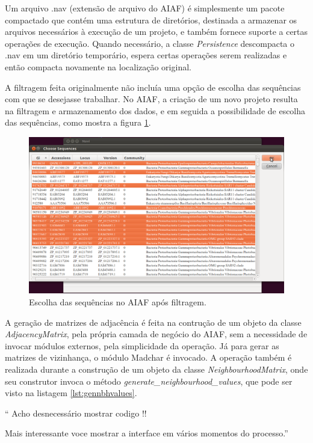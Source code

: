 Um arquivo .nav (extensão de arquivo do AIAF) é simplesmente um pacote compactado que contém uma estrutura de diretórios, destinada a armazenar os arquivos
necessários à execução de um projeto, e também fornece suporte a certas operações de execução. Quando necessário, a classe \textit{Persistence} descompacta
o .nav em um diretório temporário, espera certas operações serem realizadas e então compacta novamente na localização original.

A filtragem feita originalmente não incluía uma opção de escolha das sequências com que se desejasse trabalhar. No AIAF, a criação de um novo projeto resulta
na filtragem e armazenamento dos dados, e em seguida a possibilidade de escolha das sequências, como mostra a figura \ref{fig:choose-sequences}.

\begin{figure}
\centering
\includegraphics[scale=0.38]{choose-sequences}
\caption{Escolha das sequências no AIAF após filtragem.}
\label{fig:choose-sequences}
\end{figure}

A geração de matrizes de adjacência é feita na contrução de um objeto da classe \textit{AdjacencyMatrix}, pela própria camada de negócio do AIAF, sem a
necessidade de invocar módulos externos, pela simplicidade da operação. Já para gerar as matrizes de vizinhança, o módulo Madchar é invocado. A operação
também é realizada durante a construção de um objeto da classe \textit{NeighbourhoodMatrix}, onde seu construtor invoca o método
\textit{generate\_neighbourhood\_values}, que pode ser visto na listagem \ref{lst:gennbhvalues}.

``
Acho desnecessário mostrar codigo !!

Mais interessante voce mostrar a interface em vários momentos do processo.''

